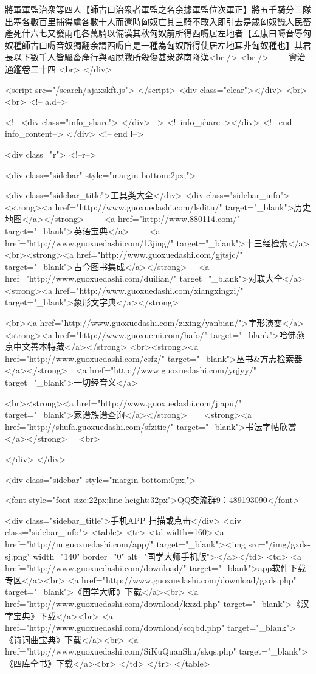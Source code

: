 將軍軍監治衆等四人【師古曰治衆者軍監之名余據軍監位次軍正】將五千騎分三隊出塞各數百里捕得虜各數十人而還時匈奴亡其三騎不敢入即引去是歲匈奴饑人民畜產死什六七又發兩屯各萬騎以備漢其秋匈奴前所得西嗕居左地者【孟康曰嗕音辱匈奴種師古曰嗕音奴獨翻余謂西嗕自是一種為匈奴所得使居左地耳非匈奴種也】其君長以下數千人皆驅畜產行與甌脫戰所殺傷甚衆遂南降漢<br />
<br />
　　資治通鑑卷二十四  <br>
   </div> 

<script src="/search/ajaxskft.js"> </script>
 <div class="clear"></div>
<br>
<br>
 <!-- a.d-->

 <!--
<div class="info_share">
</div> 
-->
 <!--info_share--></div>   <!-- end info_content-->
  </div> <!-- end l-->

<div class="r">   <!--r-->



<div class="sidebar"  style="margin-bottom:2px;">

 
<div class="sidebar_title">工具类大全</div>
<div class="sidebar_info">
<strong><a href="http://www.guoxuedashi.com/lsditu/" target="_blank">历史地图</a></strong>　　
<a href="http://www.880114.com/" target="_blank">英语宝典</a>　　
<a href="http://www.guoxuedashi.com/13jing/" target="_blank">十三经检索</a>　
<br><strong><a href="http://www.guoxuedashi.com/gjtsjc/" target="_blank">古今图书集成</a></strong>　
<a href="http://www.guoxuedashi.com/duilian/" target="_blank">对联大全</a>　<strong><a href="http://www.guoxuedashi.com/xiangxingzi/" target="_blank">象形文字典</a></strong>　

<br><a href="http://www.guoxuedashi.com/zixing/yanbian/">字形演变</a>　　<strong><a href="http://www.guoxuemi.com/hafo/" target="_blank">哈佛燕京中文善本特藏</a></strong>
<br><strong><a href="http://www.guoxuedashi.com/csfz/" target="_blank">丛书&方志检索器</a></strong>　<a href="http://www.guoxuedashi.com/yqjyy/" target="_blank">一切经音义</a>　　

<br><strong><a href="http://www.guoxuedashi.com/jiapu/" target="_blank">家谱族谱查询</a></strong>　　<strong><a href="http://shufa.guoxuedashi.com/sfzitie/" target="_blank">书法字帖欣赏</a></strong>　
<br>

</div>
</div>


<div class="sidebar" style="margin-bottom:0px;">

<font style="font-size:22px;line-height:32px">QQ交流群9：489193090</font>


<div class="sidebar_title">手机APP 扫描或点击</div>
<div class="sidebar_info">
<table>
<tr>
	<td width=160><a href="http://m.guoxuedashi.com/app/" target="_blank"><img src="/img/gxds-sj.png" width="140"  border="0" alt="国学大师手机版"></a></td>
	<td>
<a href="http://www.guoxuedashi.com/download/" target="_blank">app软件下载专区</a><br>
<a href="http://www.guoxuedashi.com/download/gxds.php" target="_blank">《国学大师》下载</a><br>
<a href="http://www.guoxuedashi.com/download/kxzd.php" target="_blank">《汉字宝典》下载</a><br>
<a href="http://www.guoxuedashi.com/download/scqbd.php" target="_blank">《诗词曲宝典》下载</a><br>
<a href="http://www.guoxuedashi.com/SiKuQuanShu/skqs.php" target="_blank">《四库全书》下载</a><br>
</td>
</tr>
</table>

